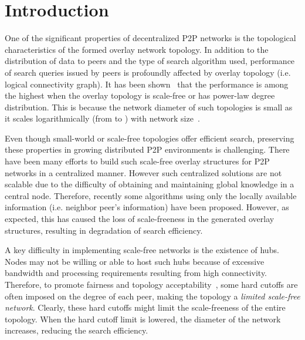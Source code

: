 \documentclass[10pt,journal,cspaper,compsoc]{IEEEtran}
\begin{document}
\maketitle


\IEEEdisplaynotcompsoctitleabstractindextext


\IEEEpeerreviewmaketitle



\section{Introduction}
\label{sec:intro}

One of the significant properties of decentralized P2P networks is the topological characteristics of the formed overlay network topology. 
In addition to the distribution of data to peers and the type of search algorithm used, performance of search queries issued by peers is profoundly affected by overlay topology (i.e. logical connectivity graph). 
It has been shown~\cite{hui} that the performance is among the highest when the overlay topology is scale-free or has power-law degree distribution. This is because the network diameter of such topologies is small as it scales logarithmically (from  to ) with network size~\cite{ultra-small}.

Even though small-world or scale-free topologies offer efficient search, 
preserving these properties in growing distributed P2P environments is challenging. 
There have been many efforts to build such scale-free overlay structures for P2P networks in a centralized manner. However such centralized solutions are not scalable due to the difficulty of obtaining and maintaining global knowledge in a central node. 
Therefore, recently some algorithms using only the locally available information (i.e. neighbor peer's information) have been proposed. 
However, as expected, this has caused the loss of scale-freeness in the generated overlay structures, resulting in degradation of search efficiency.

A key difficulty in implementing scale-free networks is the existence of hubs. Nodes may not be willing or able to host such hubs because of excessive bandwidth and processing requirements resulting from high connectivity.  
Therefore, to promote fairness and topology acceptability~\cite{guclu}, some hard cutoffs are often imposed on the degree of each peer, making the topology a {\it limited scale-free network}. Clearly, these hard cutoffs might limit the scale-freeness of the entire topology. When the hard cutoff limit is lowered, the diameter of the network increases, reducing the search efficiency.
\end{document}
